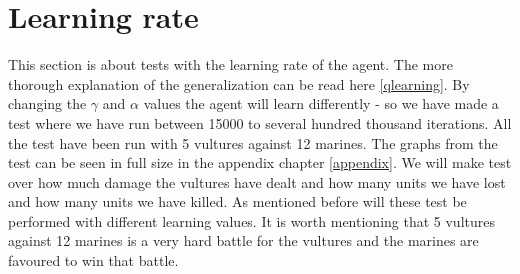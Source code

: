 \section{Learning rate}
This section is about tests with the learning rate of the agent. The more thorough explanation of the generalization can be read here \ref{qlearning}.
By changing the $\gamma$ and $\alpha$ values the agent will learn differently - so we have made a test where we have run between 15000 to several hundred thousand iterations. All the test have been run with 5 vultures against 12 marines. The graphs from the test can be seen in full size in the appendix chapter \ref{appendix}. We will make test over how much damage the vultures have dealt and how many units we have lost and how many units we have killed. As mentioned before will these test be performed with different learning values. It is worth mentioning that 5 vultures against 12 marines is a very hard battle for the vultures and the marines are favoured to win that battle.


